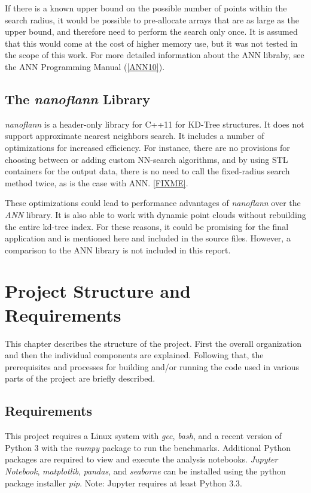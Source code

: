 If there is a known upper bound on the possible number of points within the search radius, it would be possible to pre-allocate arrays that are as large as the upper bound, and therefore need to perform the search only once. It is assumed that this would come at the cost of higher memory use, but it was not tested in the scope of this work. For more detailed information about the ANN libraby, see the ANN Programming Manual (\ref{ANN10}).

\section{The {\itshape nanoflann} Library}
\label{SECTION:NanoFLANN}
{\itshape nanoflann} is a header-only library for C++11 for KD-Tree structures.  It does not support approximate nearest neighbors search.  It includes a number of optimizations for increased efficiency.  For instance, there are no provisions for choosing between or adding custom NN-search algorithms, and by using STL containers for the output data, there is no need to call the fixed-radius search method twice, as is the case with ANN. \ref{FIXME}.

These optimizations could lead to performance advantages of {\itshape nanoflann} over the {\itshape ANN} library. It is also able to work with dynamic point clouds without rebuilding the entire kd-tree index. For these reasons, it could be promising for the final application and is mentioned here and included in the source files. However, a comparison to the ANN library is not included in this report.


\chapter{Project Structure and Requirements}

This chapter describes the structure of the project. First the overall organization and then the individual components are explained. Following that, the prerequisites and processes for building and/or running the code used in various parts of the project are briefly described.

\section{Requirements}
\label{SECTION:REQS}
This project requires a Linux system with {\itshape gcc}, {\itshape bash}, and a recent version of Python 3 with the {\itshape numpy} package to run the benchmarks. Additional Python packages are required to view and execute the analysis notebooks. {\itshape Jupyter Notebook}, {\itshape matplotlib},  {\itshape pandas}, and {\itshape seaborne} can be installed using the python package installer {\itshape pip}. Note: Jupyter requires at least Python 3.3.

